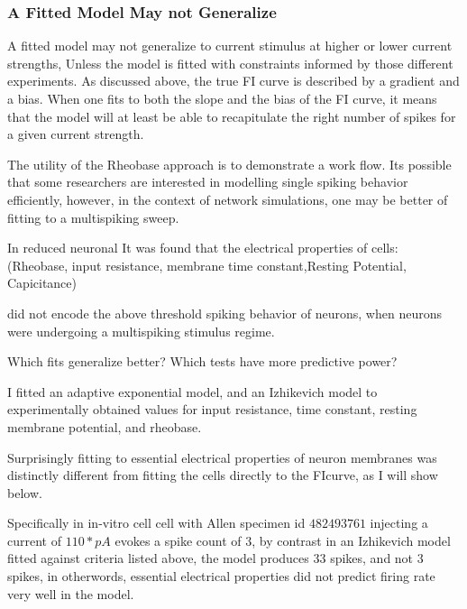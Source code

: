 \subsubsection{A Fitted Model May not Generalize}
A fitted model may not generalize to current stimulus at higher or lower current strengths, Unless the model is fitted with constraints informed by those different experiments. As discussed above, the true FI curve is described by a gradient and a bias. When one fits to both the slope and the bias of the FI curve, it means that the model will at least be able to recapitulate the right number of spikes for  a given current strength. %

%

The utility of the Rheobase approach is to demonstrate a work flow. Its possible that some researchers are interested in modelling single spiking behavior efficiently, however, in the context of network simulations, one may be better of fitting to a multispiking sweep.

In reduced neuronal It was found that the electrical properties of cells:
 (Rheobase, input resistance, membrane time constant,Resting Potential, Capicitance)

 did not encode the above threshold spiking behavior of neurons, when neurons were undergoing a multispiking stimulus regime.

Which fits generalize better? Which tests have more predictive power?

I fitted an adaptive exponential model, and an Izhikevich model to experimentally obtained values for input resistance, time constant, resting membrane potential, and rheobase.

Surprisingly fitting to essential electrical properties of neuron membranes was distinctly different from fitting the cells directly to the FIcurve, as I will show below. 

Specifically in in-vitro cell  cell with Allen specimen id $482493761$ injecting a current of $110*pA$ evokes a spike count of $3$, by contrast in an Izhikevich model fitted against criteria listed above, the model produces $33$ spikes, and not $3$ spikes, in otherwords, essential electrical properties did not predict firing rate very well in the model.

